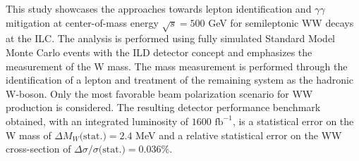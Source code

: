 %

%

 This study showcases the approaches towards lepton identification and $\gamma\gamma$ mitigation at center-of-mass energy $\sqrt{s} = 500$ GeV for semileptonic WW decays at the ILC. The analysis is performed using fully simulated Standard Model Monte Carlo events with the ILD detector concept and emphasizes the measurement of the W mass. The mass measurement is performed through the identification of a lepton and treatment of the remaining system as the hadronic W-boson. Only the most favorable beam polarization scenario for WW production is considered. The resulting detector performance benchmark obtained, with an integrated luminosity of $1600 \, \, \text{fb}^{-1}$, is a statistical error on the W mass of $\Delta M_W\text{(stat.)} =  2.4 $ MeV and a relative statistical error on the WW cross-section of $\Delta \sigma / \sigma \text{(stat.)} = 0.036\% $. 

